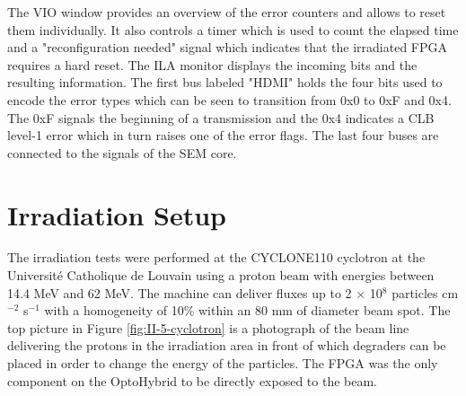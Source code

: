       The VIO window provides an overview of the error counters and allows to reset them individually. It also controls a timer which is used to count the elapsed time and a "reconfiguration needed" signal which indicates that the irradiated FPGA requires a hard reset. The ILA monitor displays the incoming bits and the resulting information. The first bus labeled "HDMI" holds the four bits used to encode the error types which can be seen to transition from 0x0 to 0xF and 0x4. The 0xF signals the beginning of a transmission and the 0x4 indicates a CLB level-1 error which in turn raises one of the error flags. The last four buses are connected to the signals of the SEM core.

  \section{Irradiation Setup}

    The irradiation tests were performed at the CYCLONE110 cyclotron at the Université Catholique de Louvain \cite{CYCLOTRON} using a proton beam with energies between 14.4 MeV and 62 MeV. The machine can deliver fluxes up to 2 $ \times $ 10$^8$ particles cm$^{-2}$ s$^{-1}$ with a homogeneity of 10\% within an 80 mm of diameter beam spot. The top picture in Figure \ref{fig:II-5-cyclotron} is a photograph of the beam line delivering the protons in the irradiation area in front of which degraders can be placed in order to change the energy of the particles. The FPGA was the only component on the OptoHybrid to be directly exposed to the beam. \\

